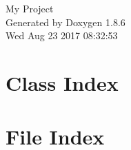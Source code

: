 \documentclass[twoside]{book}
\newcommand{\clearemptydoublepage}{%
  \newpage{\pagestyle{empty}\cleardoublepage}%
}
\begin{document}
\hypersetup{pageanchor=false}
\begin{titlepage}
\vspace*{7cm}
\begin{center}%
{\Large My Project }\\
\vspace*{1cm}
{\large Generated by Doxygen 1.8.6}\\
\vspace*{0.5cm}
{\small Wed Aug 23 2017 08:32:53}\\
\end{center}
\end{titlepage}
\clearemptydoublepage
\tableofcontents
\clearemptydoublepage
{}
\hypersetup{pageanchor=true}

\chapter{Class Index}

\chapter{File Index}

\end{document}
